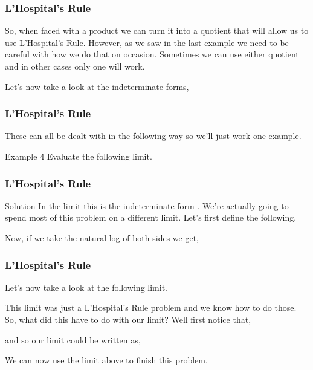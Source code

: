 \documentclass{beamer}
\begin{document}
\begin{frame}
	\frametitle{L’Hospital’s Rule}
	\large 
So, when faced with a product  we can turn it into a quotient that will allow us to use L’Hospital’s Rule.  However, as we saw in the last example we need to be careful with how we do that on occasion.  Sometimes we can use either quotient and in other cases only one will work.
 
Let’s now take a look at the indeterminate forms,

 
\end{frame}
\begin{frame}
	\frametitle{L’Hospital’s Rule}
	\large 
These can all be dealt with in the following way so we’ll just work one example.
 
Example 4  Evaluate the following limit.
\end{frame}
\begin{frame}
	\frametitle{L’Hospital’s Rule}
	\large                                                       
Solution
In the limit this is the indeterminate form .  We’re actually going to spend most of this problem on a different limit.  Let’s first define the following.
                                                                   
Now, if we take the natural log of both sides we get,
                                                
\end{frame}
\begin{frame}
	\frametitle{L’Hospital’s Rule}
	\large 
Let’s now take a look at the following limit.
                                              
 
This limit was just a L’Hospital’s Rule problem and we know how to do those.  So, what did this have to do with our limit?  Well first notice that,
                                                                 
 and so our limit could be written as,
                                                     
 
We can now use the limit above to finish this problem.
\end{frame}
\end{document}
